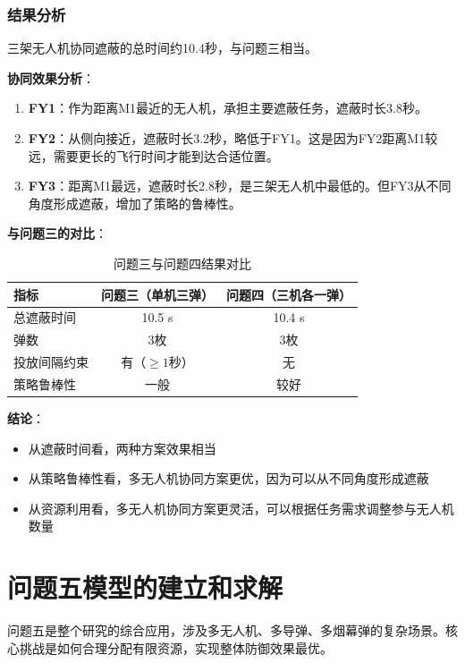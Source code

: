 \documentclass[12pt,a4paper]{article}
\begin{document}
\subsubsection{结果分析}

三架无人机协同遮蔽的总时间约10.4秒，与问题三相当。

\textbf{协同效果分析}：
\begin{enumerate}
    \item \textbf{FY1}：作为距离M1最近的无人机，承担主要遮蔽任务，遮蔽时长3.8秒。
    
    \item \textbf{FY2}：从侧向接近，遮蔽时长3.2秒，略低于FY1。这是因为FY2距离M1较远，需要更长的飞行时间才能到达合适位置。
    
    \item \textbf{FY3}：距离M1最远，遮蔽时长2.8秒，是三架无人机中最低的。但FY3从不同角度形成遮蔽，增加了策略的鲁棒性。
\end{enumerate}

\textbf{与问题三的对比}：
\begin{table}[H]
\centering
\caption{问题三与问题四结果对比}
\begin{tabular}{lcc}
\toprule
指标 & 问题三（单机三弹） & 问题四（三机各一弹） \\
\midrule
总遮蔽时间 & 10.5 s & 10.4 s \\
弹数 & 3枚 & 3枚 \\
投放间隔约束 & 有（$\geq 1$秒） & 无 \\
策略鲁棒性 & 一般 & 较好 \\
\bottomrule
\end{tabular}
\end{table}

\textbf{结论}：
\begin{itemize}
    \item 从遮蔽时间看，两种方案效果相当
    \item 从策略鲁棒性看，多无人机协同方案更优，因为可以从不同角度形成遮蔽
    \item 从资源利用看，多无人机协同方案更灵活，可以根据任务需求调整参与无人机数量
\end{itemize}

\section{问题五模型的建立和求解}

问题五是整个研究的综合应用，涉及多无人机、多导弹、多烟幕弹的复杂场景。核心挑战是如何合理分配有限资源，实现整体防御效果最优。
\end{document}
